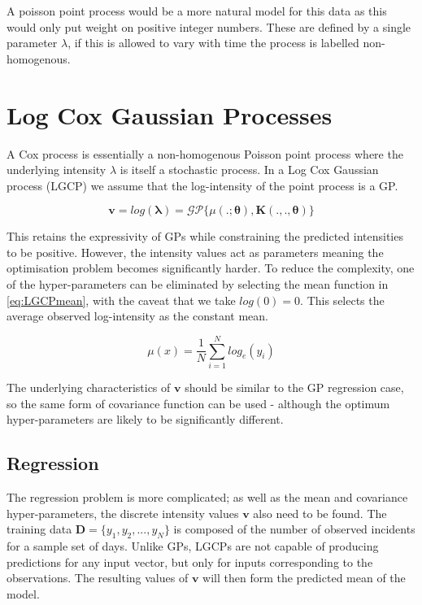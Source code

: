 \documentclass[a4paper,11pt]{report}
\begin{document}

A poisson point process would be a more natural model for this data as this would only put weight on positive integer numbers. These are defined by a single parameter \(\lambda\), if this is allowed to vary with time the process is labelled non-homogenous. 


\chapter{Log Cox Gaussian Processes}


A Cox process is essentially a non-homogenous Poisson point process where the underlying intensity \(\lambda\) is itself a stochastic process. In a Log Cox Gaussian process (LGCP) we assume that the log-intensity of the point process is a GP. 

\begin{equation} \label{eq:LGCPsetup}
\mathbf{v} = log(\boldsymbol{\lambda}) = \mathcal{G}\mathcal{P} \{ \mu(. ;\boldsymbol{\theta}) , \mathbf{K}(. , . ,\boldsymbol{\theta})\}
\end{equation}

This retains the expressivity of GPs while constraining the predicted intensities to be positive. However, the intensity values act as parameters meaning the optimisation problem becomes significantly harder. To reduce the complexity, one of the hyper-parameters can be eliminated by selecting the mean function in \ref{eq:LGCPmean}, with the caveat that we take \(log(0)=0\). This selects the average observed log-intensity as the constant mean. 

\begin{equation} \label{eq:LGCPmean}
\mu (x) = \frac{1}{N} \sum_{i=1}^{N} log_e(y_i)
\end{equation}

The underlying characteristics of \(\mathbf{v}\) should be similar to the GP regression case, so the same form of covariance function can be used - although the optimum hyper-parameters are likely to be significantly different.

\section{Regression}

The regression problem is more complicated; as well as the mean and covariance hyper-parameters, the discrete intensity values \(\mathbf{v}\) also need to be found. The training data \(\mathbf{D} = \{y_1,y_2, ..., y_N\}\) is composed of the number of observed incidents for a sample set of days. Unlike GPs, LGCPs are not capable of producing predictions for any input vector, but only for inputs corresponding to the observations. The resulting values of \(\mathbf{v}\) will then form the predicted mean of the model. \par
\end{document}
